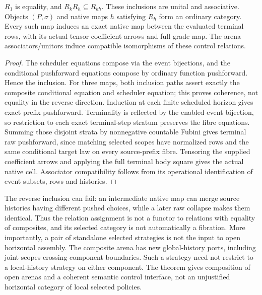 \documentclass[11pt]{article}
\begin{document}
\begin{proposition}
$R_1$ is equality, and $R_kR_h\subseteq R_{kh}$. These inclusions are unital and associative. Objects $(P,\sigma)$ and native maps $h$ satisfying $R_h$ form an ordinary category. Every such map induces an exact native map between the evaluated terminal rows, with its actual tensor coefficient arrows and full grade map. The arena associators/unitors induce compatible isomorphisms of these control relations.
\end{proposition}
\begin{proof}
The scheduler equations compose via the event bijections, and the conditional pushforward equations compose by ordinary function pushforward. Hence the inclusion. For three maps, both inclusion paths assert exactly the composite conditional equation and scheduler equation; this proves coherence, not equality in the reverse direction. Induction at each finite scheduled horizon gives exact prefix pushforward. Terminality is reflected by the enabled-event bijection, so restriction to each exact terminal-step stratum preserves the fibre equations. Summing those disjoint strata by nonnegative countable Fubini gives terminal raw pushforward, since matching selected scopes have normalized rows and the same conditional target law on every source-prefix fibre. Tensoring the supplied coefficient arrows and applying the full terminal body square gives the actual native cell. Associator compatibility follows from its operational identification of event subsets, rows and histories.\end{proof}

The reverse inclusion can fail: an intermediate native map can merge source histories having different pushed choices, while a later raw collapse makes them identical. Thus the relation assignment is not a functor to relations with equality of composites, and its selected category is not automatically a fibration. More importantly, a pair of standalone selected strategies is not the input to open horizontal assembly. The composite arena has new global-history ports, including joint scopes crossing component boundaries. Such a strategy need not restrict to a local-history strategy on either component. The theorem gives composition of open arenas and a coherent semantic control interface, not an unjustified horizontal category of local selected policies.
\end{document}
